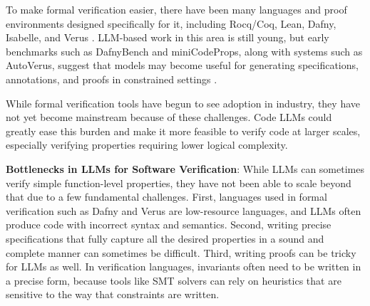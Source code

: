 To make formal verification easier, there have been many languages and proof environments designed specifically for it, including Rocq/Coq, Lean, Dafny, Isabelle, and Verus \citep{Coq-refman,de2015lean,leino2010dafny,nipkow2002isabelle,lattuada2024verus}. LLM-based work in this area is still young, but early benchmarks such as DafnyBench and miniCodeProps, along with systems such as AutoVerus, suggest that models may become useful for generating specifications, annotations, and proofs in constrained settings \citep{loughridge2024dafnybench,lohn2024minicodeprops,yang2024autoverus}.

While formal verification tools have begun to see adoption in industry, they have not yet become mainstream because of these challenges. Code LLMs could greatly ease this burden and make it more feasible to verify code at larger scales, especially verifying properties requiring lower logical complexity.

\textbf{Bottlenecks in LLMs for Software Verification}: While LLMs can sometimes verify simple function-level properties, they have not been able to scale beyond that due to a few fundamental challenges. First, languages used in formal verification such as Dafny and Verus are low-resource languages, and LLMs often produce code with incorrect syntax and semantics. Second, writing precise specifications that fully capture all the desired properties in a sound and complete manner can sometimes be difficult. Third, writing proofs can be tricky for LLMs as well. In verification languages, invariants often need to be written in a precise form, because tools like SMT solvers can rely on heuristics that are sensitive to the way that constraints are written.

